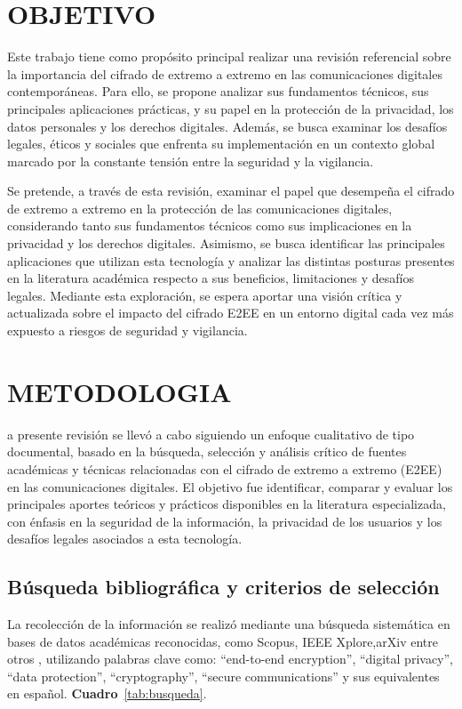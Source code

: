 \documentclass[spanish,12pt,a4paper]{article}
\begin{document}
\begin{multicols}{2}
		\section*{\normalsize OBJETIVO}
			
		Este trabajo tiene como propósito principal realizar una revisión referencial sobre la importancia del cifrado de extremo a extremo en las comunicaciones digitales contemporáneas. Para ello, se propone analizar sus fundamentos técnicos, sus principales aplicaciones prácticas, y su papel en la protección de la privacidad, los datos personales y los derechos digitales. Además, se busca examinar los desafíos legales, éticos y sociales que enfrenta su implementación en un contexto global marcado por la constante tensión entre la seguridad y la vigilancia.
		
		Se pretende, a través de esta revisión, examinar el papel que desempeña el cifrado de extremo a extremo en la protección de las comunicaciones digitales, considerando tanto sus fundamentos técnicos como sus implicaciones en la privacidad y los derechos digitales. Asimismo, se busca identificar las principales aplicaciones que utilizan esta tecnología y analizar las distintas posturas presentes en la literatura académica respecto a sus beneficios, limitaciones y desafíos legales. Mediante esta exploración, se espera aportar una visión crítica y actualizada sobre el impacto del cifrado E2EE en un entorno digital cada vez más expuesto a riesgos de seguridad y vigilancia.
		\section*{\normalsize METODOLOGIA}
		
		a presente revisión se llevó a cabo siguiendo un enfoque cualitativo de tipo documental, basado en la búsqueda, selección y análisis crítico de fuentes académicas y técnicas relacionadas con el cifrado de extremo a extremo (E2EE) en las comunicaciones digitales. El objetivo fue identificar, comparar y evaluar los principales aportes teóricos y prácticos disponibles en la literatura especializada, con énfasis en la seguridad de la información, la privacidad de los usuarios y los desafíos legales asociados a esta tecnología.
		
		\subsection*{\normalsize Búsqueda bibliográfica y criterios de selección }
		La recolección de la información se realizó mediante una búsqueda sistemática en bases de datos académicas reconocidas, como Scopus, IEEE Xplore,arXiv entre otros , utilizando palabras clave como: “end-to-end encryption”, “digital privacy”, “data protection”, “cryptography”, “secure communications” y sus equivalentes en español. \textbf{Cuadro}~\ref{tab:busqueda}.
		

\end{multicols}
\end{document}
